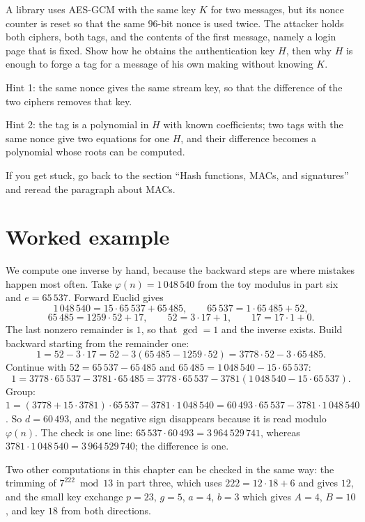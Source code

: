 \begin{tantangan}
A library uses AES-GCM with the same key $K$ for two messages, but its nonce counter is reset so that
the same $96$-bit nonce is used twice. The attacker holds both ciphers, both tags, and the contents of
the first message, namely a login page that is fixed. Show how he obtains the authentication key $H$,
then why $H$ is enough to forge a tag for a message of his own making without knowing $K$.

Hint 1: the same nonce gives the same stream key, so that the difference of the two ciphers removes
that key.

Hint 2: the tag is a polynomial in $H$ with known coefficients; two tags with the same nonce give two
equations for one $H$, and their difference becomes a polynomial whose roots can be computed.

If you get stuck, go back to the section ``Hash functions, MACs, and signatures'' and reread the
paragraph about MACs.
\end{tantangan}

\section{Worked example}

We compute one inverse by hand, because the backward steps are where mistakes happen most often. Take
$\varphi(n)=1\,048\,540$ from the toy modulus in part six and $e=65\,537$. Forward Euclid gives
\[
1\,048\,540=15\cdot65\,537+65\,485,\qquad 65\,537=1\cdot65\,485+52,
\]
\[
65\,485=1259\cdot52+17,\qquad 52=3\cdot17+1,\qquad 17=17\cdot1+0 .
\]
The last nonzero remainder is $1$, so that $\gcd=1$ and the inverse exists. Build backward starting
from the remainder one:
\[
1=52-3\cdot17=52-3(65\,485-1259\cdot52)=3778\cdot52-3\cdot65\,485 .
\]
Continue with $52=65\,537-65\,485$ and $65\,485=1\,048\,540-15\cdot65\,537$:
\[
1=3778\cdot65\,537-3781\cdot65\,485
=3778\cdot65\,537-3781(1\,048\,540-15\cdot65\,537).
\]
Group: $1=(3778+15\cdot3781)\cdot65\,537-3781\cdot1\,048\,540
=60\,493\cdot65\,537-3781\cdot1\,048\,540$. So $d=60\,493$, and the negative sign disappears
because it is read modulo $\varphi(n)$. The check is one line: $65\,537\cdot60\,493
=3\,964\,529\,741$, whereas $3781\cdot1\,048\,540=3\,964\,529\,740$; the difference is one.

Two other computations in this chapter can be checked in the same way: the trimming of
$7^{222}\bmod13$ in part three, which uses $222=12\cdot18+6$ and gives $12$, and the small key
exchange $p=23$, $g=5$, $a=4$, $b=3$ which gives $A=4$, $B=10$, and key $18$ from both directions.

